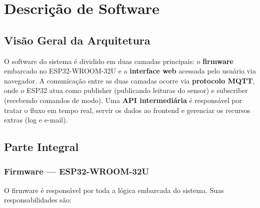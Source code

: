 
\section{Descrição de Software}

\subsection{Visão Geral da Arquitetura}

O software do sistema é dividido em duas camadas principais: o \textbf{firmware}
embarcado no ESP32-WROOM-32U e a \textbf{interface web} acessada pelo usuário via
navegador. A comunicação entre as duas camadas ocorre via \textbf{protocolo MQTT},
onde o ESP32 atua como publisher (publicando leituras do sensor) e subscriber
(recebendo comandos de modo). Uma \textbf{API intermediária} é responsável por
tratar o fluxo em tempo real, servir os dados ao frontend e gerenciar os recursos
extras (log e e-mail).

\subsection{Parte Integral}

\subsubsection{Firmware — ESP32-WROOM-32U}

O firmware é responsável por toda a lógica embarcada do sistema. Suas
responsabilidades são:

